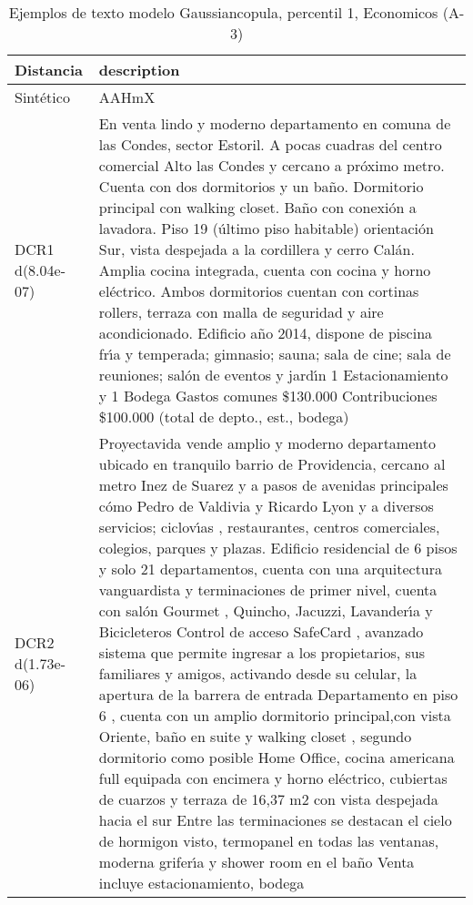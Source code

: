 \begin{table}[H]
\centering
\fontsize{10}{14}\selectfont
\caption{Ejemplos de texto modelo Gaussiancopula, percentil 1, Economicos (A-3)}
\label{table-example-economicos-a-3-gaussiancopula-1p-text}
\begin{tabular}{|l|m{35em}|}
\hline
\rowcolor[gray]{0.8}
Distancia & description \\
\hline Sintético & AAHmX \\
\hline DCR1 d(8.04e-07) & En venta lindo y moderno departamento en comuna de las Condes, sector Estoril. A pocas cuadras del centro comercial Alto las Condes y cercano a pr\'oximo metro. Cuenta con dos dormitorios y un ba\~no. Dormitorio principal con walking closet. Ba\~no con conexi\'on a lavadora. Piso 19 (\'ultimo piso habitable) orientaci\'on Sur, vista despejada a la cordillera y cerro Cal\'an. Amplia cocina integrada, cuenta con cocina y horno el\'ectrico. Ambos dormitorios cuentan con cortinas rollers, terraza con malla de seguridad y aire acondicionado. Edificio a\~no 2014, dispone de piscina fr{\'\i}a y temperada; gimnasio; sauna; sala de cine; sala de reuniones; sal\'on de eventos y jard{\'\i}n 1 Estacionamiento y 1 Bodega Gastos comunes \$130.000 Contribuciones \$100.000 (total de depto., est., bodega) \\
\hline DCR2 d(1.73e-06) & Proyectavida vende amplio y moderno departamento ubicado en tranquilo barrio de Providencia, cercano al metro Inez de Suarez y a pasos de avenidas principales c\'omo Pedro de Valdivia y Ricardo Lyon y a diversos servicios; ciclov{\'\i}as , restaurantes, centros comerciales, colegios, parques y plazas.  Edificio residencial de 6 pisos y solo 21 departamentos, cuenta con una arquitectura vanguardista y terminaciones de primer nivel, cuenta con sal\'on Gourmet , Quincho, Jacuzzi, Lavander{\'\i}a y Bicicleteros  Control de acceso SafeCard , avanzado sistema que permite ingresar a los propietarios, sus familiares y amigos, activando desde su celular, la apertura de la barrera de entrada  Departamento en piso 6 , cuenta con un amplio dormitorio principal,con vista Oriente, ba\~no en suite y walking closet , segundo dormitorio como posible Home Office, cocina americana full equipada con encimera y horno el\'ectrico, cubiertas de cuarzos y terraza de 16,37 m2 con vista despejada hacia el sur  Entre las terminaciones se destacan el cielo de hormigon visto, termopanel en todas las ventanas, moderna grifer{\'\i}a y shower room en el ba\~no  Venta incluye estacionamiento, bodega \\
\hline
\end{tabular}
\end{table}
